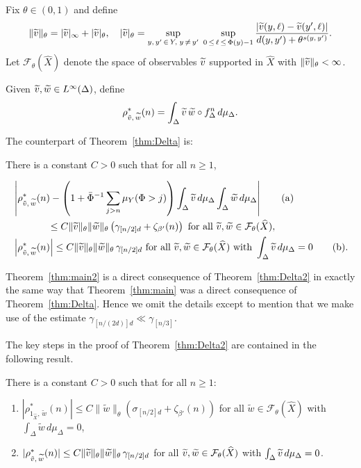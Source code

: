 \documentclass[AHL,Unicode,longabstracts,published]{cedram}
\newcommand{\cF}{\mathcal{F}}
\newcommand{\hX}{\widehat{X}}
\newcommand{\tw}{\widetilde{w}}
\newcommand{\tv}{\tilde{v}}
\newcommand{\bPhi}{\bar{\Phi}}
\newcommand*{\alphenumi}{\renewcommand*{\theenumi}{\alph{enumi}}}
\let\oldtilde\tilde
\renewcommand*{\tilde}[1]{\mathchoice{\widetilde{#1}}{\widetilde{#1}}{\oldtilde{#1}}{\oldtilde{#1}}}
\begin{document}
Fix $\theta\in(0,1)$ and define
\begin{equation}\label{eq:norm}
\|\tv\|_\theta=|\tv|_\infty+|\tv|_\theta, \quad |\tv|_\theta =\sup_{y,\,y'\,\in\,Y,\;y\,\neq\,y'}\;\sup_{0\,\le\,\ell\,\le\,\Phi(y)-1}
\frac{|\tv(y,\ell)-\tv(y',\ell)|}{d(y,y')+\theta^{s(y,\,y')}}.
\end{equation}
Let $\cF_\theta(\hX)$ denote the space of observables $\tv$ supported in $\hX$ with $\|\tv\|_\theta<\infty$.

Given $\tv,\tw\in L^\infty(\Delta)$, define
\[
\rho^*_{\tv,\,\tw}(n)=\int_\Delta \tv\,\tw\circ f_\Delta^n\,d\mu_\Delta.
\]

The counterpart of Theorem~\ref{thm:Delta} is:

\begin{theo} \label{thm:Delta2}
There is a constant $C>0$ such that for all $n\ge1$,

\begin{align}
&\left|\rho^*_{\tv,\,\tw}(n)-\left(1+\bPhi^{-1}\sum_{j>n} \mu_Y(\Phi>j)\right)\int_\Delta\tv\,d\mu_\Delta\int_\Delta\tw\,d\mu_\Delta\right|\tag{${\rm a}$}\label{theo7.6.1}\\
&\mkern65mu\le C\|\tv\|_\theta\|\tw\|_\theta\left(\gamma_{[n/2]d}+\zeta_{\beta'}(n)\right)\text{ for all }\tv,\tw\in \cF_\theta(\hX),\nonumber\\
&\left|\rho^*_{\tv,\,\tw}(n)\right|\le C\|\tv\|_\theta\|\tw\|_\theta\,\gamma_{[n/2]d}\text{ for all }\tv,\tw\in \cF_\theta(\hX)\text{ with }\int_\Delta \tv\,d\mu_\Delta=0\tag{${\rm b}$}\label{theo7.6.2}.
\end{align}
\end{theo}

Theorem~\ref{thm:main2} is a direct consequence of Theorem~\ref{thm:Delta2} in exactly the same way that Theorem~\ref{thm:main} was a direct consequence of Theorem~\ref{thm:Delta}. Hence we omit the details except to mention that we make use of the estimate $\gamma_{[n/(2d)]d}\ll \gamma_{[n/3]}$.

The key steps in the proof of Theorem~\ref{thm:Delta2} are contained in the following result.

\begin{lemm}\label{lem:Delta2}
There is a constant $C>0$ such that for all $n\ge1$:
\begin{enumerate}\alphenumi
\item \label{lemm7.7.1}$|\rho^*_{1_{\hX},\,\tw}(n)|\le C\|\tw\|_\theta(\sigma_{[n/2]d}+\zeta_{\beta'}(n))$ for all $\tw\in \cF_\theta(\hX)$ with $\int_\Delta \tw\,d\mu_\Delta=0$,
\item \label{lemm7.7.2}$|\rho^*_{\tv,\,\tw}(n)|
\le C\|\tv\|_\theta\|\tw\|_\theta\,\gamma_{[n/2]d} $ for all $\tv,\tw\in\cF_\theta(\hX)$ with $\int_\Delta \tv\,d\mu_\Delta=0$.
\end{enumerate}
\end{lemm}
\end{document}
